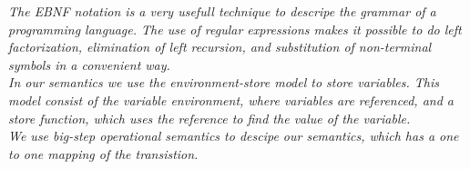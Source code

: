 \vspace{30pt}

\textit{The EBNF notation is a very usefull technique to descripe the grammar of a programming language. The use of regular expressions makes it possible to do left factorization, elimination of left recursion, and substitution of non-terminal symbols in a convenient way.\\ \indent
In our semantics we use the environment-store model to store variables. This model consist of the variable environment, where variables are referenced, and a store function, which uses the reference to find the value of the variable.\\ \indent
We use big-step operational semantics to descipe our semantics, which has a one to one mapping of the transistion.}